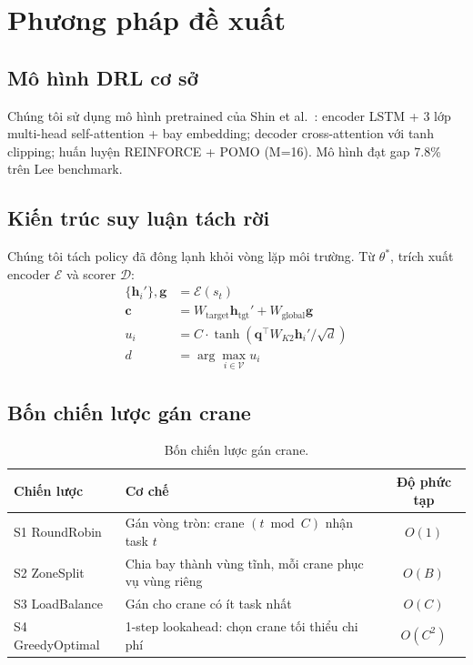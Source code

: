 \documentclass[11pt,a4paper]{elsarticle}
\begin{document}
\section{Phương pháp đề xuất}

\subsection{Mô hình DRL cơ sở}
Chúng tôi sử dụng mô hình pretrained của Shin et al.~\cite{shin2026}: encoder LSTM + 3 lớp multi-head self-attention + bay embedding; decoder cross-attention với tanh clipping; huấn luyện REINFORCE + POMO (M=16). Mô hình đạt gap 7.8\% trên Lee benchmark.

\subsection{Kiến trúc suy luận tách rời}
Chúng tôi tách policy đã đông lạnh khỏi vòng lặp môi trường. Từ $\theta^*$, trích xuất encoder $\mathcal{E}$ và scorer $\mathcal{D}$:
\begin{align}
    \{\mathbf{h}_i'\}, \mathbf{g} &= \mathcal{E}(s_t) \\
    \mathbf{c} &= W_{\text{target}}\mathbf{h}_{\text{tgt}}' + W_{\text{global}}\mathbf{g} \\
    u_i &= C \cdot \tanh(\mathbf{q}^\top W_{K2}\mathbf{h}_i' / \sqrt{d}) \\
    d &= \arg\max_{i \in \mathcal{V}} u_i
\end{align}

\subsection{Bốn chiến lược gán crane}
\begin{table}[h!]
    \centering
    \caption{Bốn chiến lược gán crane.}
    \label{tab:strategies_vi}
    \begin{tabularx}{\textwidth}{lXc}
        \toprule
        Chiến lược & Cơ chế & Độ phức tạp \\
        \midrule
        S1 RoundRobin & Gán vòng tròn: crane $(t \bmod C)$ nhận task $t$ & $O(1)$ \\
        S2 ZoneSplit & Chia bay thành vùng tĩnh, mỗi crane phục vụ vùng riêng & $O(B)$ \\
        S3 LoadBalance & Gán cho crane có ít task nhất & $O(C)$ \\
        S4 GreedyOptimal & 1-step lookahead: chọn crane tối thiểu chi phí & $O(C^2)$ \\
        \bottomrule
    \end{tabularx}
\end{table}
\end{document}
